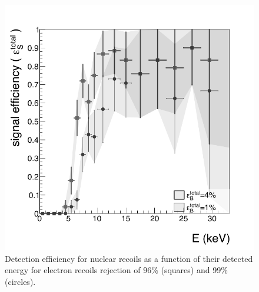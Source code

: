 \documentclass[physics,article,submit,moreauthors,pdftex]{Definitions/mdpi}
\begin{document}
 
%
%
 
\begin{figure}[t!]
  \centering
    \includegraphics[width=0.49\linewidth]{energyFull_effi_bw.png}
    \caption{Detection efficiency for nuclear recoils as a function of their detected energy for electron recoils rejection of 96\% (squares) and 99\% (circles).}
      \label{fig:coronello}
\end{figure}
\end{document}
